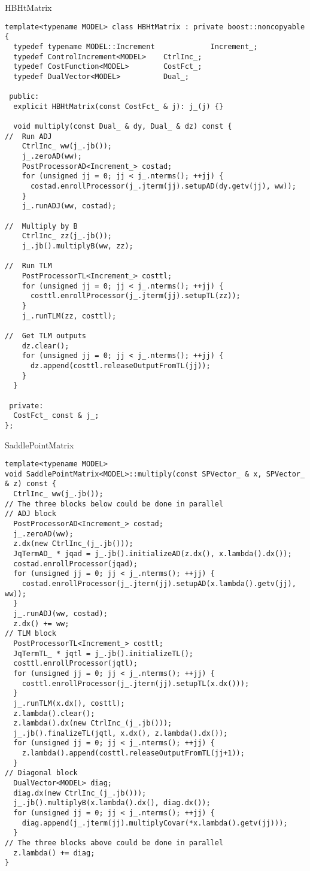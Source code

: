 \documentclass[9pt]{beamer}
\begin{document}
\begin{frame}[fragile]{HBHtMatrix}
\begin{lstlisting}[basicstyle=\ttfamily\tiny]
template<typename MODEL> class HBHtMatrix : private boost::noncopyable {
  typedef typename MODEL::Increment             Increment_;
  typedef ControlIncrement<MODEL>    CtrlInc_;
  typedef CostFunction<MODEL>        CostFct_;
  typedef DualVector<MODEL>          Dual_;

 public:
  explicit HBHtMatrix(const CostFct_ & j): j_(j) {}

  void multiply(const Dual_ & dy, Dual_ & dz) const {
//  Run ADJ
    CtrlInc_ ww(j_.jb());
    j_.zeroAD(ww);
    PostProcessorAD<Increment_> costad;
    for (unsigned jj = 0; jj < j_.nterms(); ++jj) {
      costad.enrollProcessor(j_.jterm(jj).setupAD(dy.getv(jj), ww));
    }
    j_.runADJ(ww, costad);

//  Multiply by B
    CtrlInc_ zz(j_.jb());
    j_.jb().multiplyB(ww, zz);

//  Run TLM
    PostProcessorTL<Increment_> costtl;
    for (unsigned jj = 0; jj < j_.nterms(); ++jj) {
      costtl.enrollProcessor(j_.jterm(jj).setupTL(zz));
    }
    j_.runTLM(zz, costtl);

//  Get TLM outputs
    dz.clear();
    for (unsigned jj = 0; jj < j_.nterms(); ++jj) {
      dz.append(costtl.releaseOutputFromTL(jj));
    }
  }

 private:
  CostFct_ const & j_;
};
\end{lstlisting}
\end{frame}


\begin{frame}[fragile]{SaddlePointMatrix}

\begin{lstlisting}[basicstyle=\ttfamily\tiny]
template<typename MODEL>
void SaddlePointMatrix<MODEL>::multiply(const SPVector_ & x, SPVector_ & z) const {
  CtrlInc_ ww(j_.jb());
// The three blocks below could be done in parallel
// ADJ block
  PostProcessorAD<Increment_> costad;
  j_.zeroAD(ww);
  z.dx(new CtrlInc_(j_.jb()));
  JqTermAD_ * jqad = j_.jb().initializeAD(z.dx(), x.lambda().dx());
  costad.enrollProcessor(jqad);
  for (unsigned jj = 0; jj < j_.nterms(); ++jj) {
    costad.enrollProcessor(j_.jterm(jj).setupAD(x.lambda().getv(jj), ww));
  }
  j_.runADJ(ww, costad);
  z.dx() += ww;
// TLM block
  PostProcessorTL<Increment_> costtl;
  JqTermTL_ * jqtl = j_.jb().initializeTL();
  costtl.enrollProcessor(jqtl);
  for (unsigned jj = 0; jj < j_.nterms(); ++jj) {
    costtl.enrollProcessor(j_.jterm(jj).setupTL(x.dx()));
  }
  j_.runTLM(x.dx(), costtl);
  z.lambda().clear();
  z.lambda().dx(new CtrlInc_(j_.jb()));
  j_.jb().finalizeTL(jqtl, x.dx(), z.lambda().dx());
  for (unsigned jj = 0; jj < j_.nterms(); ++jj) {
    z.lambda().append(costtl.releaseOutputFromTL(jj+1));
  }
// Diagonal block
  DualVector<MODEL> diag;
  diag.dx(new CtrlInc_(j_.jb()));
  j_.jb().multiplyB(x.lambda().dx(), diag.dx());
  for (unsigned jj = 0; jj < j_.nterms(); ++jj) {
    diag.append(j_.jterm(jj).multiplyCovar(*x.lambda().getv(jj)));
  }
// The three blocks above could be done in parallel
  z.lambda() += diag;
}
\end{lstlisting}
\end{frame}
\end{document}

